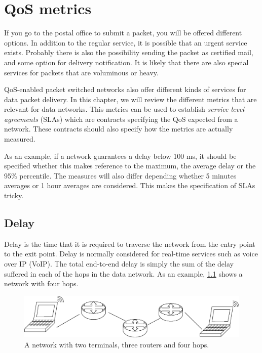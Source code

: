 \chapter{QoS metrics}
\label{cha:quality_metrics}

If you go to the postal office to submit a packet, you will be offered different options.
In addition to the regular service, it is possible that an urgent service exists.
Probably there is also the possibility sending the packet as certified mail, and some option for delivery notification.
It is likely that there are also special services for packets that are voluminous or heavy.

QoS-enabled packet switched networks also offer different kinds of services for data packet delivery.
In this chapter, we will review the different metrics that are relevant for data networks.
This metrics can be used to establish \emph{service level agreements} (SLAs) which are contracts specifying the QoS expected from a network.
These contracts should also specify how the metrics are actually measured.

As an example, if a network guarantees a delay below 100 ms, it should be specified whether this makes reference to the maximum, the average delay or the 95\% percentile.
The measures will also differ depending whether 5 minutes averages or 1 hour averages are considered.
This makes the specification of SLAs tricky.

\section{Delay}

Delay is the time that it is required to traverse the network from the entry point to the exit point.
Delay is normally considered for real-time services such as voice over IP (VoIP).
The total end-to-end delay is simply the sum of the delay suffered in each of the hops in the data network.
As an example, \ref{fig:four_hops} shows a network with four hops.

\begin{figure}[h]
\centering
\includegraphics[width=\linewidth]{figures/four_hops.eps}
\caption{A network with two terminals, three routers and four hops.}
\label{fig:four_hops}
\end{figure}

